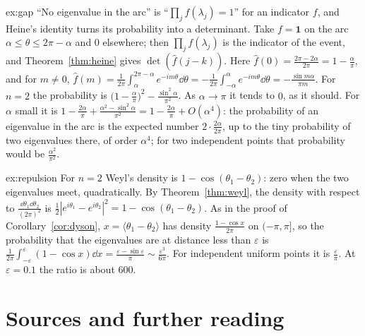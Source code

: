 \begin{solution}{ex:gap}
\idea ``No eigenvalue in the arc'' is ``$\prod_jf(\lambda_j)=1$'' for an indicator $f$, and Heine's identity turns its probability into a determinant.
\writeup Take $f=\mathbf 1$ on the arc $\alpha\le\theta\le2\pi-\alpha$ and $0$ elsewhere; then $\prod_jf(\lambda_j)$ is the indicator of the event, and Theorem~\ref{thm:heine} gives $\det(\hat f(j-k))$. Here
$\hat f(0)=\frac{2\pi-2\alpha}{2\pi}=1-\frac\alpha\pi$, and for $m\neq0$, $\hat f(m)=\frac1{2\pi}\int_\alpha^{2\pi-\alpha}e^{-im\theta}\dd\theta=-\frac1{2\pi}\int_{-\alpha}^{\alpha}e^{-im\theta}\dd\theta=-\frac{\sin m\alpha}{\pi m}$. For $n=2$ the
probability is $\bigl(1-\frac\alpha\pi\bigr)^2-\frac{\sin^2\alpha}{\pi^2}$. As $\alpha\to\pi$ it tends to $0$, as it should. For $\alpha$ small it is $1-\frac{2\alpha}\pi+\frac{\alpha^2-\sin^2\alpha}{\pi^2}=1-\frac{2\alpha}\pi+O(\alpha^4)$: the
probability of an eigenvalue in the arc is the expected number $2\cdot\frac{2\alpha}{2\pi}$, up to the tiny probability of two eigenvalues there, of order $\alpha^4$; for two independent points that
probability would be $\frac{\alpha^2}{\pi^2}$.
\end{solution}

\begin{solution}{ex:repulsion}
\idea For $n=2$ Weyl's density is $1-\cos(\theta_1-\theta_2)$: zero when the two eigenvalues meet, quadratically.
\writeup By Theorem~\ref{thm:weyl}, the density with respect to $\frac{\dd\theta_1\dd\theta_2}{(2\pi)^2}$ is $\frac12|e^{i\theta_1}-e^{i\theta_2}|^2=1-\cos(\theta_1-\theta_2)$. As in the proof of Corollary~\ref{cor:dyson},
$x=\langle\theta_1-\theta_2\rangle$ has density $\frac{1-\cos x}{2\pi}$ on $(-\pi,\pi]$, so the probability that the eigenvalues are at distance less than $\varepsilon$ is $\frac1{2\pi}\int_{-\varepsilon}^\varepsilon(1-\cos x)\dd x=\frac{\varepsilon-\sin\varepsilon}\pi
\sim\frac{\varepsilon^3}{6\pi}$. For independent uniform points it is $\frac\varepsilon\pi$. At $\varepsilon=0.1$ the ratio is about $600$.
\end{solution}

\section*{Sources and further reading}

